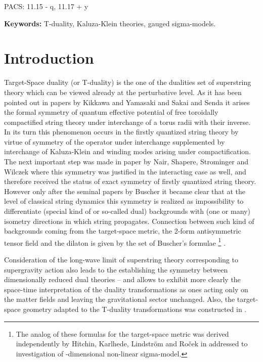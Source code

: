 \documentclass[a4paper,11pt]{article}
\begin{document}
\vspace{2.8cm}

PACS: 11.15 - q, 11.17 + y

\vspace{0.8cm}
{\bf Keywords:} T-duality, Kaluza-Klein theories, gauged sigma-models.

\newpage



\section{Introduction}

Target-Space duality (or T-duality) is the one of the dualities
set of superstring theory which can be viewed already at the
perturbative level. As it has been pointed out in papers by
Kikkawa and Yamasaki \cite{ky} and Sakai and Senda \cite{ss} 
it arises the formal symmetry of quantum effective potential of 
free toroidally compactified string theory
under interchange of a
torus radii with their inverse. In its turn this phenomenon occurs
in the firstly quantized string theory by virtue of symmetry of
the \coordHE{} operator under \coordHE{}
interchange supplemented by interchange of Kaluza-Klein and
winding modes arising under compactification.
The next important step was made in paper by Nair, Shapere,
Strominger and Wilczek \cite{dssw} where this symmetry was
justified in the interacting case as well, and therefore received the
status of exact symmetry of firstly quantized string theory.
However only after the seminal papers by Buscher \cite{buscher} it
became clear that at the level of classical string dynamics this
symmetry is realized as impossibility to differentiate (special
kind of or so-called dual) backgrounds with (one or many)
isometry directions in which string propagates. Connection
between such kind of backgrounds coming from the target-space
metric, the 2-form antisymmetric tensor field and the dilaton is
given by the set of Buscher's formulae
\footnote{The analog of these formulas for the target-space metric was derived
independently by Hitchin, Karlhede, Lindstr{\"o}m and Ro{\v{c}}ek
in \cite{hklr} addressed to investigation of \coordHE{}-dimensional
non-linear sigma-model.}
\cite{buscher}.

Consideration of the long-wave limit of superstring theory
corresponding to supergravity action also leads to the
establishing the symmetry between dimensionally reduced dual
theories \cite{hw}--\cite{bho} and allows to exhibit more clearly
the space-time interpretation of the duality transformations as
ones acting only on the matter fields and leaving the
gravitational sector unchanged. Also, the target-space geometry
adapted to the T-duality transformations was constructed in
\cite{borlaf}.
\end{document}
